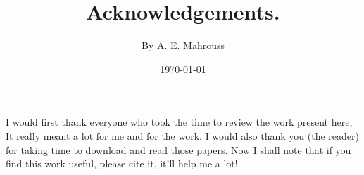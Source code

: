 \documentclass[10pt]{article}
\title{%
	\vspace{-1.5em}%
	\large\textbf{Acknowledgements.}%
}
\author{By A. E. Mahrouss}
\date{\today}
\theoremstyle{plain}
\theoremstyle{definition}
\theoremstyle{remark}
\begin{document}

\maketitle

I would first thank everyone who took the time to review the work present here, It really meant a lot for me and for the work. I would also thank you (the reader) for taking time to download and read those papers. Now I shall note that if you find this work useful, please cite it, it'll help me a lot!

\end{document}

